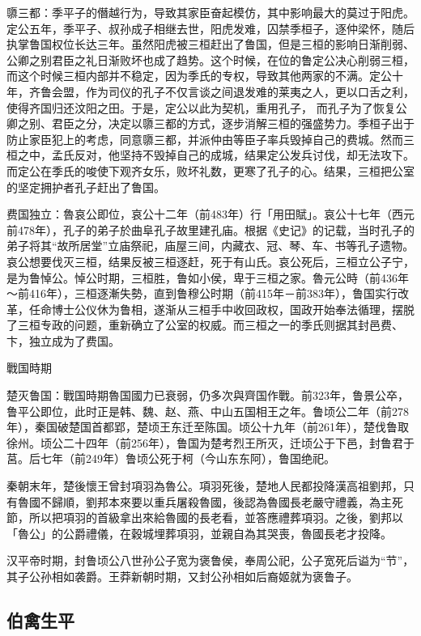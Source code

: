 隳三都：季平子的僭越行为，导致其家臣奋起模仿，其中影响最大的莫过于阳虎。定公五年，季平子、叔孙成子相继去世，阳虎发难，囚禁季桓子，逐仲梁怀，随后执掌鲁国权位长达三年。虽然阳虎被三桓赶出了鲁国，但是三桓的影响日渐削弱、公卿之别君臣之礼日渐败坏也成了趋势。这个时候，在位的鲁定公决心削弱三桓，而这个时候三桓内部并不稳定，因为季氏的专权，导致其他两家的不满。定公十年，齐鲁会盟，作为司仪的孔子不仅言谈之间退发难的莱夷之人，更以口舌之利，使得齐国归还汶阳之田。于是，定公以此为契机，重用孔子， 而孔子为了恢复公卿之别、君臣之分，决定以隳三都的方式，逐步消解三桓的强盛势力。季桓子出于防止家臣犯上的考虑，同意隳三都，并派仲由等臣子率兵毁掉自己的费城。然而三桓之中，孟氏反对，他坚持不毁掉自己的成城，结果定公发兵讨伐，却无法攻下。而定公在季氏的唆使下观齐女乐，败坏礼数，更寒了孔子的心。结果，三桓把公室的坚定拥护者孔子赶出了鲁国。

费国独立：魯哀公即位，哀公十二年（前483年）行「用田賦」。哀公十七年（西元前478年），孔子的弟子於曲阜孔子故里建孔庙。根据《史记》的记载，当时孔子的弟子将其“故所居堂”立庙祭祀，庙屋三间，内藏衣、冠、琴、车、书等孔子遗物。哀公想要伐灭三桓，结果反被三桓逐赶，死于有山氏。哀公死后，三桓立公子宁，是为鲁悼公。悼公时期，三桓胜，鲁如小侯，卑于三桓之家。魯元公時（前436年～前416年），三桓逐漸失勢，直到鲁穆公时期（前415年－前383年），鲁国实行改革，任命博士公仪休为鲁相，遂渐从三桓手中收回政权，国政开始奉法循理，摆脱了三桓专政的问题，重新确立了公室的权威。而三桓之一的季氏则据其封邑费、卞，独立成为了费国。

戰国時期

楚灭鲁国：戰国時期魯国國力已衰弱，仍多次與齊国作戰。前323年，鲁景公卒，鲁平公即位，此时正是韩、魏、赵、燕、中山五国相王之年。鲁顷公二年（前278年），秦国破楚国首都郢，楚顷王东迁至陈国。顷公十九年（前261年），楚伐鲁取徐州。顷公二十四年（前256年），鲁国为楚考烈王所灭，迁顷公于下邑，封鲁君于莒。后七年（前249年）鲁顷公死于柯（今山东东阿），鲁国绝祀。

秦朝末年，楚後懷王曾封項羽為魯公。項羽死後，楚地人民都投降漢高祖劉邦，只有魯國不歸順，劉邦本來要以重兵屠殺魯國，後認為魯國長老嚴守禮義，為主死節，所以把項羽的首級拿出來給魯國的長老看，並答應禮葬項羽。之後，劉邦以「魯公」的公爵禮儀，在穀城埋葬項羽，並親自為其哭喪，魯國長老才投降。

汉平帝时期，封鲁顷公八世孙公子宽为褒鲁侯，奉周公祀，公子宽死后谥为“节”，其子公孙相如袭爵。王莽新朝时期，又封公孙相如后裔姬就为褒鲁子。


\subsection{伯禽生平}

